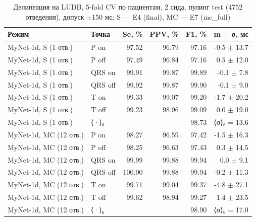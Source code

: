 \begin{table}[t]
\centering
\small
\caption{Делинеация на LUDB, 5-fold CV по пациентам, 2 сида, пулинг test (4752 отведения), допуск $\pm$150 мс; S — E4 (final), MC — E7 (mc_full)}
\label{tab:final}
\begin{tabular}{llrrrr}
\toprule
Режим & Точка & Se, \% & PPV, \% & F1, \% & m $\pm$ σ, мс \\
\midrule
MyNet-1d, S (1 отв.) & P on & 97.52 & 96.79 & 97.16 & -0.5 $\pm$ 13.7 \\
MyNet-1d, S (1 отв.) & P off & 97.49 & 96.84 & 97.16 & 0.5 $\pm$ 12.0 \\
MyNet-1d, S (1 отв.) & QRS on & 99.91 & 99.87 & 99.89 & -0.1 $\pm$ 7.8 \\
MyNet-1d, S (1 отв.) & QRS off & 99.92 & 99.87 & 99.90 & -0.1 $\pm$ 9.0 \\
MyNet-1d, S (1 отв.) & T on & 99.33 & 99.07 & 99.20 & -1.7 $\pm$ 20.2 \\
MyNet-1d, S (1 отв.) & T off & 99.23 & 98.96 & 99.09 & 0.0 $\pm$ 19.0 \\
MyNet-1d, S (1 отв.) & ⟨·⟩₆ &  &  & 98.73 & ⟨σ⟩₆ = 13.6 \\
MyNet-1d, MC (12 отв.) & P on & 98.27 & 96.59 & 97.42 & -1.5 $\pm$ 16.3 \\
MyNet-1d, MC (12 отв.) & P off & 98.25 & 96.63 & 97.43 & 0.3 $\pm$ 14.5 \\
MyNet-1d, MC (12 отв.) & QRS on & 99.99 & 99.88 & 99.94 & 0.0 $\pm$ 9.1 \\
MyNet-1d, MC (12 отв.) & QRS off & 100.00 & 99.88 & 99.94 & -0.2 $\pm$ 11.3 \\
MyNet-1d, MC (12 отв.) & T on & 99.71 & 99.04 & 99.37 & -4.8 $\pm$ 27.1 \\
MyNet-1d, MC (12 отв.) & T off & 99.62 & 98.94 & 99.27 & 1.4 $\pm$ 23.5 \\
MyNet-1d, MC (12 отв.) & ⟨·⟩₆ &  &  & 98.90 & ⟨σ⟩₆ = 17.0 \\
\bottomrule
\end{tabular}
\end{table}

